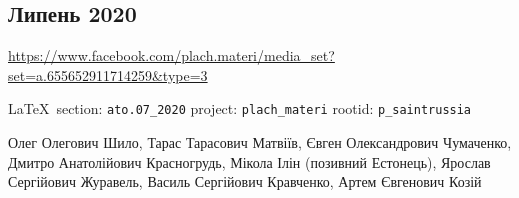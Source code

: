  
 

\subsection{Липень 2020}
\url{https://www.facebook.com/plach.materi/media_set?set=a.655652911714259&type=3}
  
\vspace{0.5cm}
{\small\LaTeX~section: \verb|ato.07_2020| project: \verb|plach_materi| rootid: \verb|p_saintrussia|}
\vspace{0.5cm}

Олег Олегович Шило, Тарас Тарасович Матвіїв, Євген Олександрович Чумаченко,
Дмитро Анатолійович Красногрудь, Мікола Ілін (позивний Естонець), Ярослав
Сергійович Журавель, Василь Сергійович Кравченко, Артем Євгенович Козій
  
